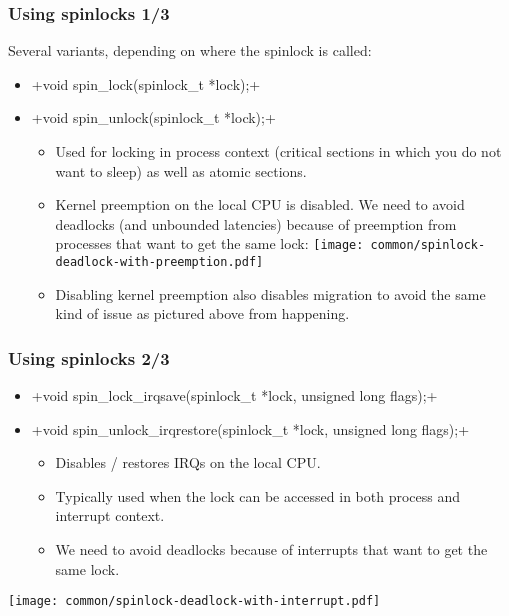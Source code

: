 \begin{frame}[fragile]
  \frametitle{Using spinlocks 1/3}
  Several variants, depending on where the spinlock is called:
  \begin{itemize}
  \item {}+void spin_lock(spinlock_t *lock);+
  \item {}+void spin_unlock(spinlock_t *lock);+
    \begin{itemize}
    \item Used for locking in process context (critical sections
      in which you do not want to sleep) as well as atomic
      sections.
    \item Kernel preemption on the local CPU is disabled. We need
      to avoid deadlocks (and unbounded latencies) because of preemption
      from processes that want to get the same lock:
      \texttt{[image: common/spinlock-deadlock-with-preemption.pdf]}
    \item Disabling kernel preemption also disables migration to avoid
      the same kind of issue as pictured above from happening.
    \end{itemize}
  \end{itemize}
\end{frame}

\begin{frame}[fragile]
  \frametitle{Using spinlocks 2/3}
  \begin{itemize}
  \item {}+void spin_lock_irqsave(spinlock_t *lock, unsigned long flags);+
  \item {}+void spin_unlock_irqrestore(spinlock_t *lock, unsigned long flags);+
    \begin{itemize}
    \item Disables / restores IRQs on the local CPU.
    \item Typically used when the lock can be accessed in both process
      and interrupt context.
    \item We need to avoid deadlocks because of interrupts that want
          to get the same lock.
    \end{itemize}
  \end{itemize}
  \texttt{[image: common/spinlock-deadlock-with-interrupt.pdf]}
\end{frame}


